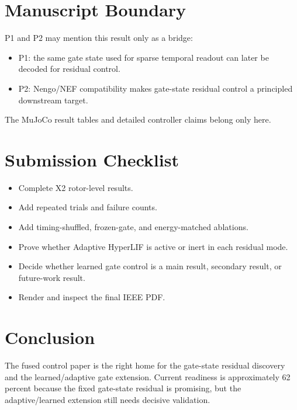 \documentclass[journal]{IEEEtran}
\begin{document}
\section{Manuscript Boundary}
P1 and P2 may mention this result only as a bridge:
\begin{itemize}
  \item P1: the same gate state used for sparse temporal readout can later be decoded for residual control.
  \item P2: Nengo/NEF compatibility makes gate-state residual control a principled downstream target.
\end{itemize}
The MuJoCo result tables and detailed controller claims belong only here.

\section{Submission Checklist}
\begin{itemize}
  \item Complete X2 rotor-level results.
  \item Add repeated trials and failure counts.
  \item Add timing-shuffled, frozen-gate, and energy-matched ablations.
  \item Prove whether Adaptive HyperLIF is active or inert in each residual mode.
  \item Decide whether learned gate control is a main result, secondary result, or future-work result.
  \item Render and inspect the final IEEE PDF.
\end{itemize}

\section{Conclusion}
The fused control paper is the right home for the gate-state residual discovery and the learned/adaptive gate extension. Current readiness is approximately 62 percent because the fixed gate-state residual is promising, but the adaptive/learned extension still needs decisive validation.
\end{document}
